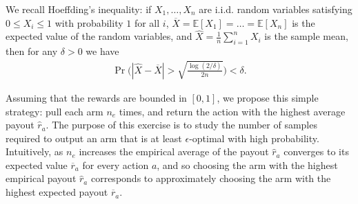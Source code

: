 \documentclass{article}
\newcommand{\E}{\mathbb{E}}
\begin{document}
We recall Hoeffding's inequality: if $X_1,\dots,X_n$ are i.i.d. random variables satisfying $0 \le X_i \le 1$ with probability $1$ for all $i$, $\overline X = \E[X_1] = \dots = \E[X_n]$ is the expected value of the random variables, and $\widehat X = \frac{1}{n} \sum_{i=1}^n X_i$ is the sample mean, then for any $\delta > 0$ we have
\begin{align}
\Pr\Bigg(|\widehat X - \overline X | > \sqrt{\frac{\log(2/\delta)}{2n}}	\Bigg) < \delta.
\end{align}

Assuming that the rewards are bounded in $[0,1]$,
we propose this simple strategy: pull each arm $n_e$ times, and return the action with the highest average payout $\widehat r_a$. The purpose of this exercise is to study the number of samples required to output an arm that is at least $\epsilon$-optimal with high probability.
Intuitively, as $n_e$ increases the empirical average of the payout $\widehat r_a$ converges to its expected value $\overline r_a$ for every action $a$, and so choosing the arm with the highest empirical payout $\widehat r_a$ corresponds to approximately choosing the arm with the highest expected payout $\overline r_a$.
\end{document}
